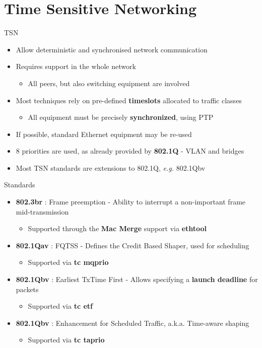 \section{Time Sensitive Networking}

\begin{frame}{TSN}
	\begin{itemize}
		\item Allow deterministic and synchronised network communication
		\item Requires support in the whole network
			\begin{itemize}
				\item All peers, but also switching equipment are involved
			\end{itemize}
		\item Most techniques rely on pre-defined \textbf{timeslots} allocated to traffic classes
			\begin{itemize}
				\item All equipment must be precisely \textbf{synchronized}, using PTP
			\end{itemize}
		\item If possible, standard Ethernet equipment may be re-used
		\item 8 priorities are used, as already provided by \textbf{802.1Q} - VLAN and bridges
		\item Most TSN standards are extensions to 802.1Q, \textit{e.g.} 802.1Qbv
	\end{itemize}
\end{frame}

\begin{frame}{Standards}
	\begin{itemize}
		\item \textbf{802.3br} : Frame preemption - Ability to interrupt a non-important frame mid-transmission
			\begin{itemize}
				\item Supported through the \textbf{Mac Merge} support via \textbf{ethtool}
			\end{itemize}
		\item \textbf{802.1Qav} : FQTSS - Defines the Credit Based Shaper, used for scheduling
			\begin{itemize}
				\item Supported via \textbf{tc mqprio}
			\end{itemize}
		\item \textbf{802.1Qbv} : Earliest TxTime First - Allows specifying a \textbf{launch deadline} for packets
			\begin{itemize}
				\item Supported via \textbf{tc etf}
			\end{itemize}
		\item \textbf{802.1Qbv} : Enhancement for Scheduled Traffic, a.k.a. Time-aware shaping
			\begin{itemize}
				\item Supported via \textbf{tc taprio}
			\end{itemize}
	\end{itemize}
\end{frame}

